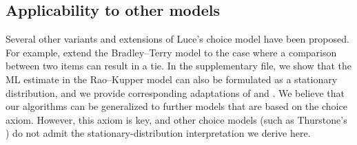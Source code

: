 \subsection{Applicability to other models}

Several other variants and extensions of Luce's choice model have been proposed.
For example, \citet{rao1967ties} extend the Bradley--Terry model to the case where a comparison between two items can result in a tie.
In the supplementary file, we show that the ML estimate in the Rao--Kupper model can also be formulated as a stationary distribution, and we provide corresponding adaptations of \LSR{} and \ILSR{}.
We believe that our algorithms can be generalized to further models that are based on the choice axiom.
However, this axiom is key, and other choice models (such as Thurstone's \citep{thurstone1927method}) do not admit the stationary-distribution interpretation we derive here.
